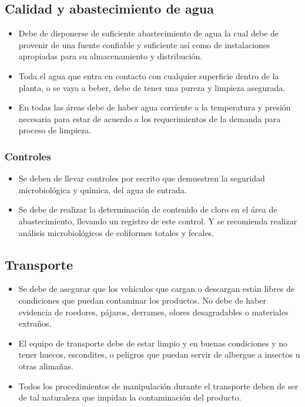 \subsection{Calidad y abastecimiento de agua}
\begin{itemize}
	\item Debe de disponerse de suficiente abastecimiento de agua la cual debe de provenir de una fuente confiable y suficiente así como de instalaciones apropiadas para su almacenamiento y distribución.
	\item Toda el agua que entra en contacto con cualquier superficie dentro de la planta, o se vaya a beber, debe de tener una pureza y limpieza asegurada.
	\item En todas las áreas debe de haber agua corriente a la temperatura y presión necesaria para estar de acuerdo a los requerimientos de la demanda para proceso de limpieza.
\end{itemize}

\subsubsection{Controles}
\begin{itemize}
	\item Se deben de llevar controles por escrito que demuestren la seguridad microbiológica y química, del agua de entrada.
	\item Se debe de realizar la determinación de contenido de cloro en el área de abastecimiento, llevando un registro de este control. Y se recomienda realizar análisis microbiológicos de coliformes totales y fecales.
\end{itemize}

\subsection{Transporte}
\begin{itemize}
	\item Se debe de asegurar que los vehículos que cargan o descargan están libres de condiciones que puedan contaminar los productos. No debe de haber evidencia de roedores, pájaros, derrames, olores desagradables o materiales extraños.
	\item El equipo de transporte debe de estar limpio y en buenas condiciones y no tener huecos, escondites, o peligros que puedan servir de albergue a insectos u otras alimañas.
	\item Todos los procedimientos de manipulación durante el transporte deben de ser de tal naturaleza que impidan la contaminación del producto.
\end{itemize}

